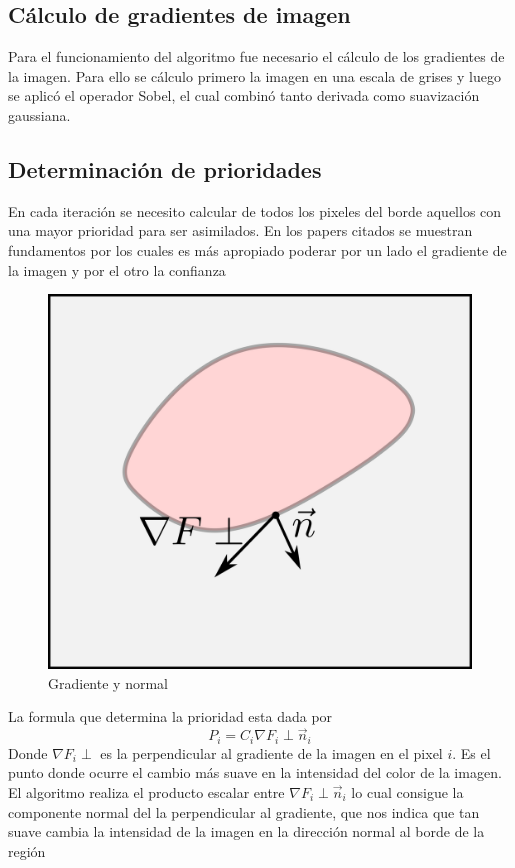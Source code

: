 \documentclass[conference]{IEEEtran}
\begin{document}
\subsection{Cálculo de gradientes de imagen}
Para el funcionamiento del algoritmo fue necesario el cálculo de los gradientes de la imagen. Para ello se cálculo primero la imagen en una escala de grises y luego se aplicó el operador Sobel, el cual combinó tanto derivada como suavización gaussiana. 

\subsection{Determinación de prioridades}
En cada iteración se necesito calcular de todos los pixeles del borde aquellos con una mayor prioridad para ser asimilados. En los papers citados se muestran fundamentos por los cuales es más apropiado poderar por un lado el gradiente de la imagen y por el otro la confianza 
\begin{figure}[!ht]
\begin{centering}
\includegraphics[scale=1]{normal_gradiente.png}
\par\end{centering}
\caption{Gradiente y normal}
\end{figure}
La formula que determina la prioridad esta dada por
\begin{equation}
P_i = C_i \nabla  F_i \perp \vec n_i
\end{equation}
Donde $\nabla F_i \perp$ es la perpendicular al gradiente de la imagen en el pixel $i$. Es el punto donde ocurre el cambio más suave en la intensidad del color de la imagen. El algoritmo realiza el producto escalar entre $\nabla F_i \perp \vec n_i$ lo cual consigue la componente normal del la perpendicular al gradiente, que nos indica que tan suave cambia la intensidad de la imagen en la dirección normal al borde de la región
\end{document}
